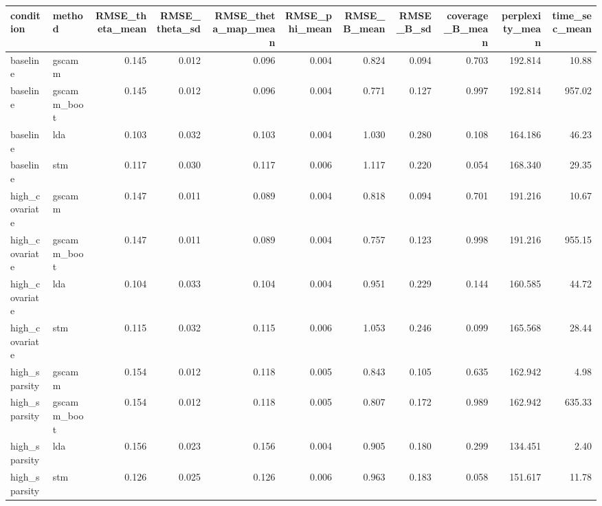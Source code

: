 \begin{tabular}{llrrrrrrrrr}
\hline
condition & method & RMSE\_theta\_mean & RMSE\_theta\_sd & RMSE\_theta\_map\_mean & RMSE\_phi\_mean & RMSE\_B\_mean & RMSE\_B\_sd & coverage\_B\_mean & perplexity\_mean & time\_sec\_mean \\
\hline
baseline & gscamm & 0.145 & 0.012 & 0.096 & 0.004 & 0.824 & 0.094 & 0.703 & 192.814 & 10.88 \\
baseline & gscamm_boot & 0.145 & 0.012 & 0.096 & 0.004 & 0.771 & 0.127 & 0.997 & 192.814 & 957.02 \\
baseline & lda & 0.103 & 0.032 & 0.103 & 0.004 & 1.030 & 0.280 & 0.108 & 164.186 & 46.23 \\
baseline & stm & 0.117 & 0.030 & 0.117 & 0.006 & 1.117 & 0.220 & 0.054 & 168.340 & 29.35 \\
high_covariate & gscamm & 0.147 & 0.011 & 0.089 & 0.004 & 0.818 & 0.094 & 0.701 & 191.216 & 10.67 \\
high_covariate & gscamm_boot & 0.147 & 0.011 & 0.089 & 0.004 & 0.757 & 0.123 & 0.998 & 191.216 & 955.15 \\
high_covariate & lda & 0.104 & 0.033 & 0.104 & 0.004 & 0.951 & 0.229 & 0.144 & 160.585 & 44.72 \\
high_covariate & stm & 0.115 & 0.032 & 0.115 & 0.006 & 1.053 & 0.246 & 0.099 & 165.568 & 28.44 \\
high_sparsity & gscamm & 0.154 & 0.012 & 0.118 & 0.005 & 0.843 & 0.105 & 0.635 & 162.942 & 4.98 \\
high_sparsity & gscamm_boot & 0.154 & 0.012 & 0.118 & 0.005 & 0.807 & 0.172 & 0.989 & 162.942 & 635.33 \\
high_sparsity & lda & 0.156 & 0.023 & 0.156 & 0.004 & 0.905 & 0.180 & 0.299 & 134.451 & 2.40 \\
high_sparsity & stm & 0.126 & 0.025 & 0.126 & 0.006 & 0.963 & 0.183 & 0.058 & 151.617 & 11.78 \\
\hline
\end{tabular}
